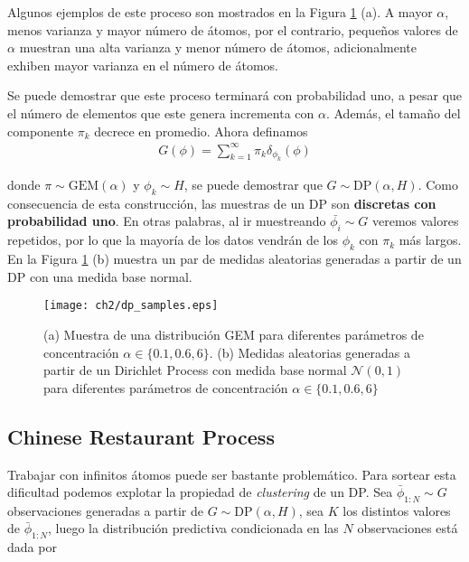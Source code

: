 \documentclass[letterpaper,12pt,oneside]{book} %
\begin{document}
Algunos ejemplos de este proceso son mostrados en la Figura \ref{img:dp_samples} (a). A mayor $\alpha$, menos varianza y mayor número de átomos, por el contrario, pequeños valores de $\alpha$ muestran una alta varianza y menor número de átomos, adicionalmente exhiben mayor varianza en el número de átomos.

Se puede demostrar que este proceso terminará con probabilidad uno, a pesar que el número de elementos que este genera incrementa con $\alpha$. Además, el tamaño del componente $\pi_{k}$ decrece en promedio. Ahora definamos 
\begin{align}
    G(\phi) = \sum_{k=1}^{\infty}\pi_{k}\delta_{\phi_{k}}(\phi)
\end{align}

donde $\pi \sim \text{GEM}(\alpha)$ y $\phi_{k} \sim H$, se puede demostrar que $G \sim \text{DP}(\alpha, H)$. Como consecuencia de esta construcción, las muestras de un DP son \textbf{discretas con probabilidad uno}. En otras palabras, al ir muestreando $\bar{\phi_{i}}\sim G$ veremos valores repetidos, por lo que la mayoría de los datos vendrán de los $\phi_{k}$ con $\pi_{k}$ más largos. En la Figura \ref{img:dp_samples} (b) muestra un par de medidas aleatorias generadas a partir de un DP con una medida base normal.\\

\begin{figure}
    \centering
    \texttt{[image: ch2/dp\_samples.eps]}
    \caption{(a) Muestra de una distribución GEM para diferentes parámetros de concentración $\alpha\in \{0.1, 0.6, 6\}$. (b) Medidas aleatorias generadas a partir de un Dirichlet Process con medida base normal $\mathcal{N}(0,1)$ para diferentes parámetros de concentración $\alpha\in \{0.1, 0.6, 6\}$}
    \label{img:dp_samples}
\end{figure}

\subsection{Chinese Restaurant Process}
\label{sec:crp}

Trabajar con infinitos átomos puede ser bastante problemático. Para sortear esta dificultad podemos explotar la propiedad de \textit{clustering} de un DP. Sea $\bar{\phi}_{1:N}\sim G$ observaciones generadas a partir de $G\sim \text{DP}(\alpha, H)$, sea $K$ los distintos valores de $\bar{\phi}_{1:N}$, luego la distribución predictiva condicionada en las $N$ observaciones está dada por
\end{document}
